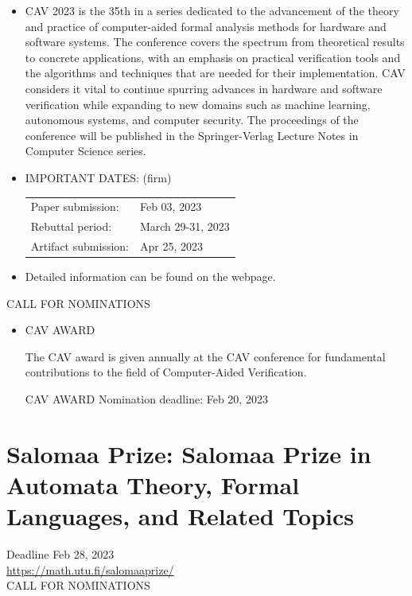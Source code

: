 \documentclass[prodmode,acmtecs]{acmsmall} %
\begin{document}
\begin{itemize}\item  CAV 2023 is the 35th in a series dedicated to the advancement of the theory and practice of computer-aided formal analysis methods for hardware and   software systems. The conference covers the spectrum from theoretical results to concrete applications, with an emphasis on practical verification tools and the algorithms and techniques that are needed for their implementation. CAV considers it vital to continue spurring advances in hardware and software verification while expanding to new domains such as machine learning, autonomous systems, and computer security. The proceedings of the conference will be published in the Springer-Verlag Lecture Notes in Computer Science series. 
 
\item  IMPORTANT DATES: (firm) 
 
\begin{tabulary}{\linewidth}{LL}Paper submission:  & Feb 03, 2023 \\
Rebuttal period:  & March 29-31, 2023 \\
Artifact submission:  & Apr 25, 2023 \\
\end{tabulary}
 
\item  Detailed information can be found on the webpage. 
 
\end{itemize}CALL FOR NOMINATIONS 

\begin{itemize}\item CAV AWARD 
 
  The CAV award is given annually at the CAV conference for fundamental contributions to the field of Computer-Aided Verification. 
 
CAV AWARD Nomination deadline: Feb 20, 2023 
 
\end{itemize}\section{Salomaa Prize: Salomaa Prize in Automata Theory, Formal Languages, and Related Topics}\label{SalomaaPrize}  Deadline Feb 28, 2023\\ 
  \href{https://math.utu.fi/salomaaprize/}{https://math.utu.fi/salomaaprize/}\\ 
CALL FOR NOMINATIONS 
\end{document}
